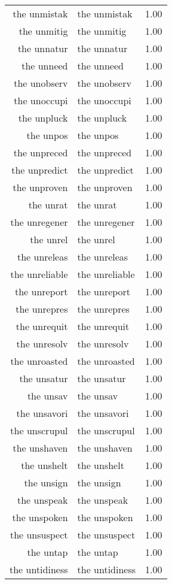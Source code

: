 \begin{table}[ht]
\begin{tabular}{rlr}
  the unmistak & the unmistak & 1.00 \\ 
  the unmitig & the unmitig & 1.00 \\ 
  the unnatur & the unnatur & 1.00 \\ 
  the unneed & the unneed & 1.00 \\ 
  the unobserv & the unobserv & 1.00 \\ 
  the unoccupi & the unoccupi & 1.00 \\ 
  the unpluck & the unpluck & 1.00 \\ 
  the unpos & the unpos & 1.00 \\ 
  the unpreced & the unpreced & 1.00 \\ 
  the unpredict & the unpredict & 1.00 \\ 
  the unproven & the unproven & 1.00 \\ 
  the unrat & the unrat & 1.00 \\ 
  the unregener & the unregener & 1.00 \\ 
  the unrel & the unrel & 1.00 \\ 
  the unreleas & the unreleas & 1.00 \\ 
  the unreliable & the unreliable & 1.00 \\ 
  the unreport & the unreport & 1.00 \\ 
  the unrepres & the unrepres & 1.00 \\ 
  the unrequit & the unrequit & 1.00 \\ 
  the unresolv & the unresolv & 1.00 \\ 
  the unroasted & the unroasted & 1.00 \\ 
  the unsatur & the unsatur & 1.00 \\ 
  the unsav & the unsav & 1.00 \\ 
  the unsavori & the unsavori & 1.00 \\ 
  the unscrupul & the unscrupul & 1.00 \\ 
  the unshaven & the unshaven & 1.00 \\ 
  the unshelt & the unshelt & 1.00 \\ 
  the unsign & the unsign & 1.00 \\ 
  the unspeak & the unspeak & 1.00 \\ 
  the unspoken & the unspoken & 1.00 \\ 
  the unsuspect & the unsuspect & 1.00 \\ 
  the untap & the untap & 1.00 \\ 
  the untidiness & the untidiness & 1.00 \\ 

\end{tabular}
\end{table}
